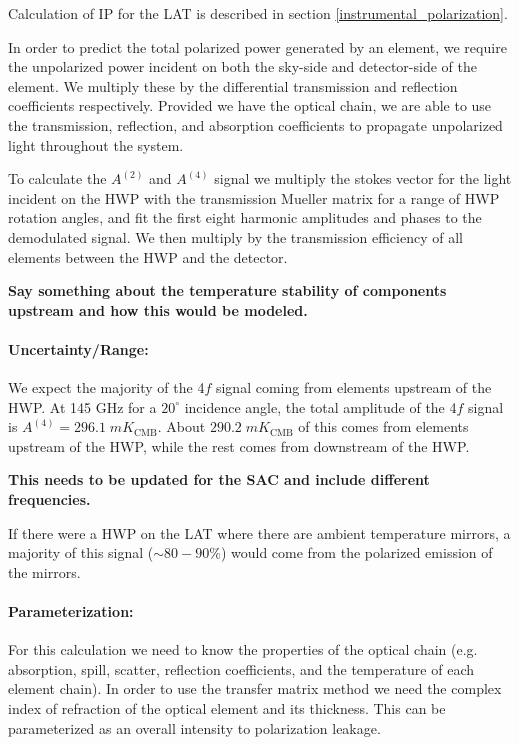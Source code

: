 Calculation of IP for the LAT is described in section \ref{instrumental_polarization}.

In order to predict the total polarized power generated by an element, we require the unpolarized power incident on both the sky-side and detector-side of the element. We multiply these by the differential transmission and reflection coefficients respectively.
Provided we have the optical chain, we are able to use the transmission, reflection, and absorption coefficients to propagate unpolarized light throughout the system.

To calculate the $A^{(2)}$ and $A^{(4)}$ signal we multiply the stokes vector for the light incident on the HWP with the transmission Mueller matrix for a range of HWP rotation angles, and fit the first eight harmonic amplitudes and phases to the demodulated signal. 
We then multiply by the transmission efficiency of all elements between the HWP and the detector.

\textbf{Say something about the temperature stability of components upstream and how this would be modeled.}

\paragraph{Uncertainty/Range:} 
We expect the majority of the 4$f$ signal coming from elements upstream of the HWP.
At 145 GHz for a $20^\circ$ incidence angle, the total amplitude of the 4$f$ signal is $A^{(4)} = 296.1 \; mK_\text{CMB}$.
About $290.2 \; mK_\text{CMB}$ of this comes from elements upstream of the HWP, while the rest comes from downstream of the HWP.

\textbf{This needs to be updated for the SAC and include different frequencies.}

If there were a HWP on the LAT where there are ambient temperature mirrors, a majority of this signal ($\sim 80-90\%$) would come from the polarized emission of the mirrors.

\paragraph{Parameterization:}
For this calculation we need to know the properties of the optical chain (e.g. absorption, spill, scatter, reflection coefficients, and 
the temperature of each element chain). In order to use the transfer matrix method we need the complex index of refraction of the optical element and its thickness. This can be parameterized as an overall intensity to polarization leakage.


